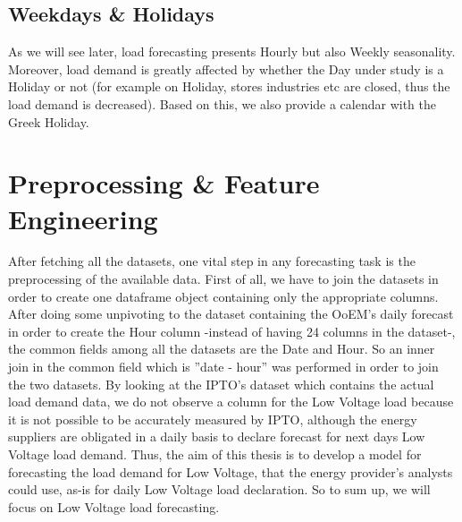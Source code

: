 \subsection{Weekdays \& Holidays}
As we will see later, load forecasting presents Hourly but also Weekly seasonality. Moreover, load demand is greatly affected by whether the Day under study is a Holiday or not (for example on Holiday, stores industries etc are closed, thus the load demand is decreased). Based on this, we also provide a calendar with the Greek Holiday.
\section{Preprocessing \& Feature Engineering}
After fetching all the datasets, one vital step in any forecasting task is the preprocessing of the available data. First of all, we have to join the datasets in order to create one dataframe object containing only the appropriate columns. After doing some unpivoting to the dataset containing the OoEM's daily forecast in order to create the Hour column -instead of having 24 columns in the dataset-, the common fields among all the datasets are the Date and Hour. So an inner join in the common field which is ”date - hour” was performed in order to join the two datasets. By looking at the IPTO's dataset which contains the actual load demand data, we do not observe a column for the Low Voltage load because it is not possible to be accurately measured by IPTO, although the energy suppliers are obligated in a daily basis to declare forecast for next days Low Voltage load demand. Thus, the aim of this thesis is to develop a model for forecasting the load demand for Low Voltage, that the energy provider's analysts could use, as-is for daily Low Voltage load declaration. So to sum up, we will focus on Low Voltage load forecasting. 
